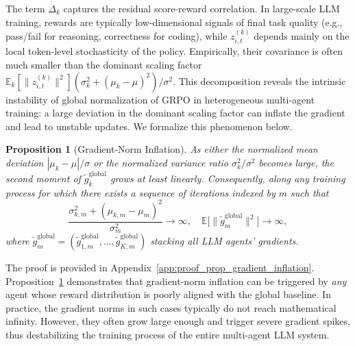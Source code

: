 \documentclass[]{fairmeta}
\theoremstyle{plain}
\newtheorem{proposition}[theorem]{Proposition}
\theoremstyle{definition}
\theoremstyle{remark}
\begin{document}
The term $\Delta_k$ captures the residual score-reward correlation. In large-scale LLM training, rewards are typically low-dimensional signals of final task quality (e.g., pass/fail for reasoning, correctness for coding), while $z_{i,t}^{(k)}$ depends mainly on the local token-level stochasticity of the policy. Empirically, their covariance is often much smaller than the dominant scaling factor $\mathbb{E}_k[\|z_{i,t}^{(k)}\|^2](\sigma_k^2 + (\mu_k - \mu)^2)/\sigma^2$. This decomposition reveals the intrinsic instability of global normalization of GRPO in heterogeneous multi-agent training: a large deviation in the dominant scaling factor can inflate the gradient and lead to unstable updates. We formalize this phenomenon below.
\begin{proposition}[Gradient-Norm Inflation]
\label{prop:gradient-inflation}
As either the normalized mean deviation
$|\mu_k - \mu| / \sigma$ or the normalized variance ratio
$\sigma_k^2 / \sigma^2$ becomes large, the second moment of
$\tilde{g}_k^{\mathrm{global}}$ grows at least linearly. Consequently, along any training process for which there exists a sequence of iterations indexed by $m$ such that
$$
\frac{\sigma_{k,m}^2 + (\mu_{k,m} - \mu_m)^2}{\sigma_m^2} \to \infty, \quad  \mathbb{E}\bigl[\|\tilde{g}_m^{\mathrm{global}}\|^2\bigr] \to \infty,
$$
where $\tilde{g}_{m}^{\mathrm{global}} = (\tilde{g}_{1,m}^{\mathrm{global}},\dots,\tilde{g}_{K,m}^{\mathrm{global}})$ stacking all LLM agents' gradients.
\end{proposition}
The proof is provided in Appendix~\ref{app:proof_prop_gradient_inflation}. Proposition~\ref{prop:gradient-inflation} demonstrates that gradient-norm inflation can be triggered by \emph{any} agent whose reward distribution is poorly aligned with the global baseline. In practice, the gradient norms in such cases typically do not reach mathematical infinity. However, they often grow large enough and trigger severe gradient spikes, thus destabilizing the training process of the entire multi-agent LLM system.
\end{document}
